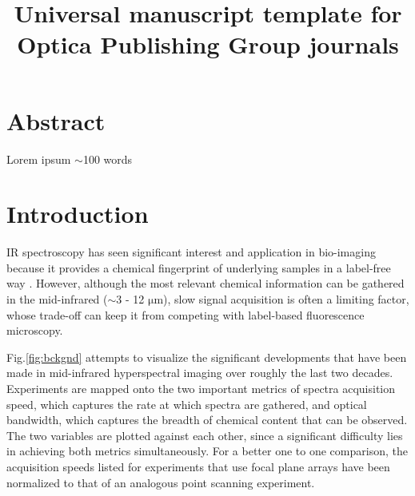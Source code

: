 \documentclass{optica-article}
\begin{document}
\title{Universal manuscript template for Optica Publishing Group journals}

\section{Abstract}
Lorem ipsum $\sim$100 words

\section{Introduction}
IR spectroscopy has seen significant interest and application in bio-imaging because it provides a chemical fingerprint of underlying samples in a label-free way \cite{baker_using_2014}. However, although the most relevant chemical information can be gathered in the mid-infrared ($\sim$3 - 12 $\mathrm{\mu m}$), slow signal acquisition is often a limiting factor, whose trade-off can keep it from competing with label-based fluorescence microscopy.

\mbox{Fig.\ref{fig:bckgnd}} attempts to visualize the significant developments that have been made in mid-infrared hyperspectral imaging over roughly the last two decades. Experiments are mapped onto the two important metrics of spectra acquisition speed, which captures the rate at which spectra are gathered, and optical bandwidth, which captures the breadth of chemical content that can be observed. The two variables are plotted against each other, since a significant difficulty lies in achieving both metrics simultaneously. For a better one to one comparison, the acquisition speeds listed for experiments that use focal plane arrays have been normalized to that of an analogous point scanning experiment.

\end{document}
